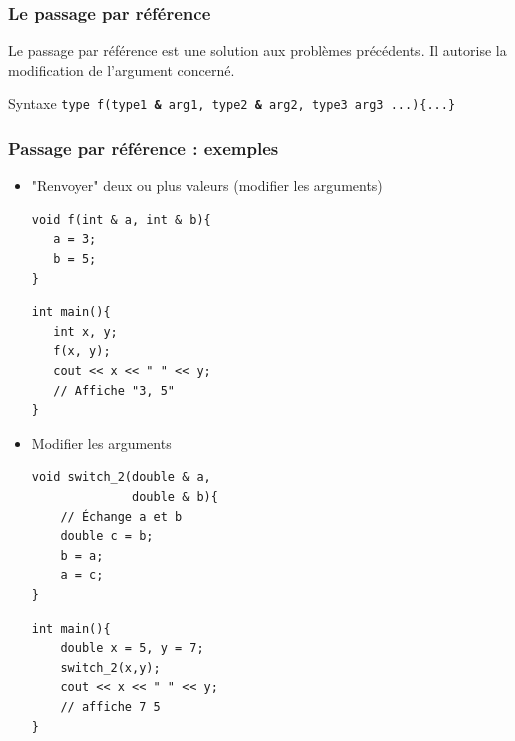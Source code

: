\begin{frame}
	\frametitle{Le passage par référence}

	Le passage par référence est une solution aux problèmes précédents. Il autorise la modification de l'argument concerné.

	\begin{block}{Syntaxe}
	\texttt{type f(type1 {\huge\textbf{\&}} arg1, type2 {\huge\textbf{\&}} arg2, type3 arg3 ...)\{...\}}
	\end{block}
\end{frame}

\begin{frame}[fragile]
	\frametitle{Passage par référence : exemples}
	\begin{itemize}
	\item "Renvoyer" deux ou plus valeurs (modifier les arguments)
	\begin{minipage}{0.49\linewidth}
		\begin{verbatim}
void f(int & a, int & b){
   a = 3;
   b = 5;
}
		\end{verbatim}
	\end{minipage}
	\hfill
	\begin{minipage}{0.47\linewidth}
		\begin{verbatim}
int main(){
   int x, y;
   f(x, y);
   cout << x << " " << y;
   // Affiche "3, 5"
}
		\end{verbatim}
	\end{minipage}
	\item Modifier les arguments

	\begin{minipage}{0.49\linewidth}
			\begin{verbatim}
void switch_2(double & a,
              double & b){
    // Échange a et b
    double c = b;
    b = a;
    a = c;
}
			\end{verbatim}
		\end{minipage}
		\hfill
		\begin{minipage}{0.47\linewidth}
			\begin{verbatim}
int main(){
    double x = 5, y = 7;
    switch_2(x,y);
    cout << x << " " << y;
    // affiche 7 5
}
			\end{verbatim}
		\end{minipage}
	\end{itemize}
\end{frame}

